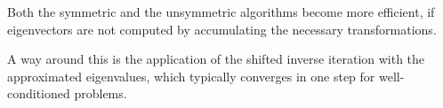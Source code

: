 \begin{remark}
  Both the symmetric and the unsymmetric algorithms become more
  efficient, if eigenvectors are not computed by accumulating the
  necessary transformations.

  A way around this is the application of the shifted inverse
  iteration with the approximated eigenvalues, which typically
  converges in one step for well-conditioned problems.
\end{remark}


